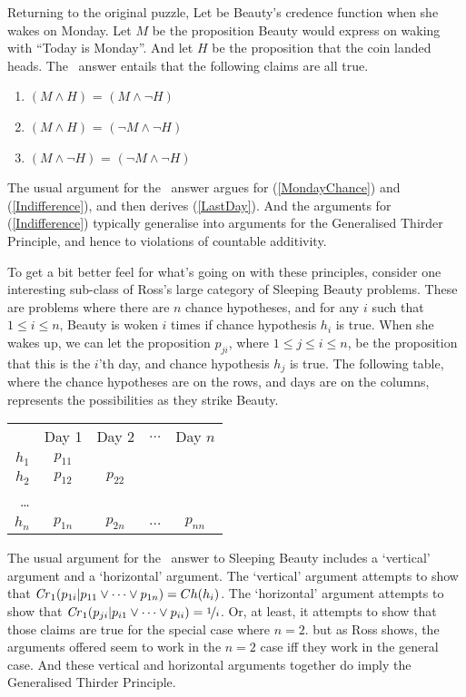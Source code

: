 Returning to the original puzzle, Let  be Beauty's credence function when she wakes on Monday. Let $M$ be the proposition Beauty would express on waking with ``Today is Monday''. And let $H$ be the proposition that the coin landed heads. The \third\ answer entails that the following claims are all true.

\begin{enumerate}
\renewcommand{\labelenumi}{(\arabic{enumi})}
\item \label{MondayChance} $(M \wedge H)$ = $(M \wedge \neg H)$
\item \label{LastDay} $(M \wedge H)$ = $(\neg M \wedge \neg H)$
\item \label{Indifference} $(M \wedge \neg H)$ = $(\neg M \wedge \neg H)$
\end{enumerate}

\noindent The usual argument for the \third\ answer argues for (\ref{MondayChance}) and (\ref{Indifference}), and then derives (\ref{LastDay}). And the arguments for (\ref{Indifference}) typically generalise into arguments for the Generalised Thirder Principle, and hence to violations of countable additivity.

To get a bit better feel for what's going on with these principles, consider one interesting sub-class of Ross's large category of Sleeping Beauty problems. These are problems where there are $n$ chance hypotheses, and for any $i$ such that $1 \leq i \leq n$, Beauty is woken $i$ times if chance hypothesis $h_i$ is true. When she wakes up, we can let the proposition $p_{ji}$, where $1 \leq j \leq i \leq n$, be the proposition that this is the $i$'th day, and chance hypothesis $h_j$ is true. The following table, where the chance hypotheses are on the rows, and days are on the columns, represents the possibilities as they strike Beauty.

\begin{center}
\begin{tabular}{r c c c c}
 & Day 1 & Day 2 & $\dots$ & Day $n$ \\
$h_1$ & $p_{11}$ \\
$h_2$ & $p_{12}$ & $p_{22}$ \\
\dots \\
$h_n$ & $p_{1n}$ & $p_{2n}$ & $\dots$ & $p_{nn}$\\
\end{tabular}
\end{center}

\noindent The usual argument for the \third\ answer to Sleeping Beauty includes a `vertical' argument and a `horizontal' argument. The `vertical' argument attempts to show that $\text{\textit{Cr}}_1(p_{1i} | p_{11} \vee \dots \vee p_{1n}) = Ch(h_i)$. The `horizontal' argument attempts to show that $\text{\textit{Cr}}_1(p_{ji} | p_{i1} \vee \dots \vee p_{ii}) = \nicefrac{1}{i}$. Or, at least, it attempts to show that those claims are true for the special case where $n = 2$. but as Ross shows, the arguments offered seem to work in the $n = 2$ case iff they work in the general case. And these vertical and horizontal arguments together do imply the Generalised Thirder Principle.

